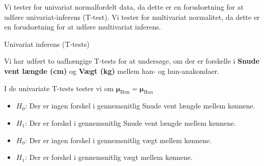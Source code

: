 \documentclass[final]{beamer}
\newlength{\colwidth}
\begin{document}
\begin{frame}[t]
\begin{columns}[t]
\begin{column}{\colwidth}
Vi tester for univariat normalfordelt data, da dette er en forudsætning for at udføre univariat-inferens (T-test). Vi tester for multivariat normalitet, da dette er en forudsætning for at udføre multivariat inferens.

\vspace{0.5em}


  
\begin{block}{Univariat inferens (T-tests)}
  \justifying

 Vi har udført to uafhængige T-tests for at undersøge, om der er forskelle i \textbf{Snude vent længde (cm)} og \textbf{Vægt (kg)} mellem han- og hun-anakondaer.
	
I de univariate T-tests tester vi om 
\textbf{\boldmath$\boldsymbol{\mu}_{\text{Hun}} = \boldsymbol{\mu}_{\text{Han}}$}



\begin{itemize}
  \item $H_0$: Der er ingen forskel i gennemsnitlig Snude vent længde mellem kønnene.
  \item $H_1$: Der er forskel i gennemsnitlig Snude vent længde mellem kønnene.
  
  \vspace{0.5em}
  
  \item $H_0$: Der er ingen forskel i gennemsnitlig vægt mellem kønnene.
  \item $H_1$: Der er forskel i gennemsnitlig vægt mellem kønnene.
\end{itemize}
\vspace{1em}
	
	\vspace{-1em}
	
  \begin{table}
    \centering
    

\end{table}
\end{block}
\end{column}
\end{columns}
\end{frame}
\end{document}
